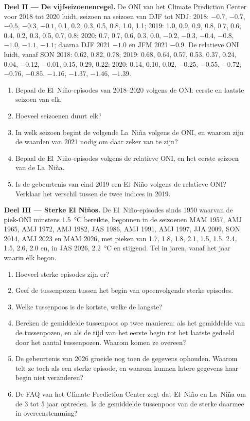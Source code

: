 \begin{problem}
\medskip\noindent\textbf{Deel II --- De vijfseizoenenregel.}
De ONI van het Climate Prediction Center voor 2018 tot 2020 luidt, seizoen na seizoen van DJF tot
NDJ: 2018: $-0.7$, $-0.7$, $-0.5$, $-0.3$, $-0.1$, 0.1, 0.2, 0.3, 0.5, 0.8, 1.0, 1.1; 2019: 1.0,
0.9, 0.9, 0.8, 0.7, 0.6, 0.4, 0.2, 0.3, 0.5, 0.7, 0.8; 2020: 0.7, 0.7, 0.6, 0.3, 0.0, $-0.2$,
$-0.3$, $-0.4$, $-0.8$, $-1.0$, $-1.1$, $-1.1$; daarna DJF 2021 $-1.0$ en JFM 2021 $-0.9$. De
relatieve ONI luidt, vanaf SON 2018: 0.62, 0.82, 0.78; 2019: 0.68, 0.64, 0.57, 0.53, 0.37, 0.24,
0.04, $-0.12$, $-0.01$, 0.15, 0.29, 0.22; 2020: 0.14, 0.10, 0.02, $-0.25$, $-0.55$, $-0.72$,
$-0.76$, $-0.85$, $-1.16$, $-1.37$, $-1.46$, $-1.39$.
\begin{enumerate}[resume]
  \item Bepaal de El~Niño-episodes van 2018--2020 volgens de ONI: eerste en laatste seizoen van elk.
  \item Hoeveel seizoenen duurt elk?
  \item In welk seizoen begint de volgende La~Niña volgens de ONI, en waarom zijn de
        waarden van 2021 nodig om daar zeker van te zijn?
  \item Bepaal de El~Niño-episodes volgens de relatieve ONI, en het eerste seizoen van de La~Niña.
  \item Is de gebeurtenis van eind 2019 een El~Niño volgens de relatieve ONI? Verklaar het verschil
        tussen de twee indices in 2019.
\end{enumerate}

\medskip\noindent\textbf{Deel III --- Sterke El Niños.}
De El~Niño-episodes sinds 1950 waarvan de piek-ONI minstens \qty{1.5}{\celsius} bereikte, begonnen in de
seizoenen MAM 1957, AMJ 1965, AMJ 1972, AMJ 1982, JAS 1986, AMJ 1991, AMJ 1997, JJA 2009, SON 2014,
AMJ 2023 en MAM 2026, met pieken van 1.7, 1.8, 1.8, 2.1, 1.5, 1.5, 2.4, 1.5, 2.6, 2.0 en, in
JAS 2026, \qty{2.2}{\celsius} en stijgend. Tel in jaren, vanaf het jaar waarin elk begon.
\begin{enumerate}[resume]
  \item Hoeveel sterke episodes zijn er?
  \item Geef de tussenpozen tussen het begin van opeenvolgende sterke episodes.
  \item Welke tussenpoos is de kortste, welke de langste?
  \item Bereken de gemiddelde tussenpoos op twee manieren: als het gemiddelde van de tussenpozen, en als de tijd
        van het eerste begin tot het laatste gedeeld door het aantal tussenpozen. Waarom komen ze overeen?
  \item De gebeurtenis van 2026 groeide nog toen de gegevens ophouden. Waarom telt ze toch
        als een sterke episode, en waarom kunnen latere gegevens haar begin niet veranderen?
  \item De FAQ van het Climate Prediction Center zegt dat El~Niño en La~Niña om de 3 tot 5
        jaar optreden. Is de gemiddelde tussenpoos van de sterke daarmee in overeenstemming?
\end{enumerate}


\end{problem}
